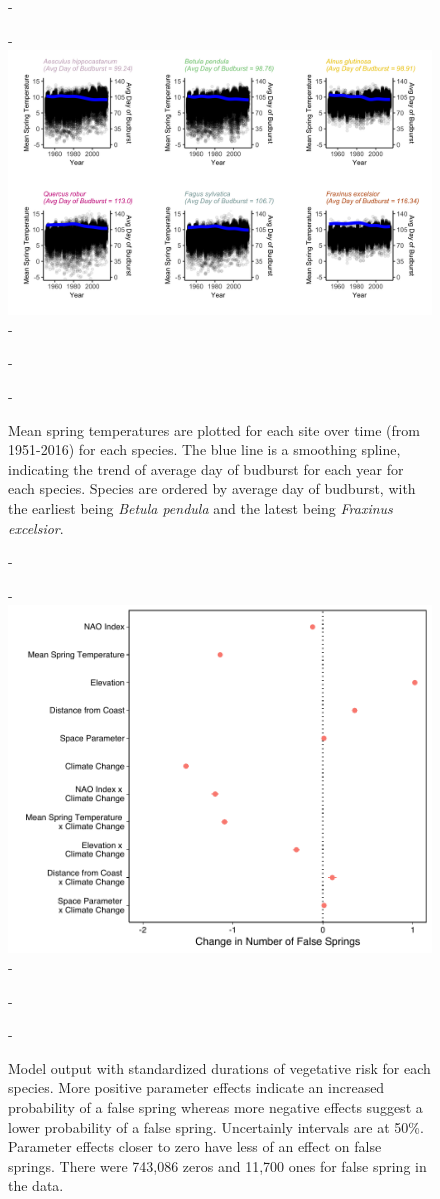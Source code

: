 \documentclass{article}\usepackage[]{graphicx}\usepackage[]{color}
\begin{document}
{\begin{figure} [H]
  -\begin{center}
  -\includegraphics[width=16cm]{..//figures/MSTBB_bySpp.png}
  -\caption{Mean spring temperatures are plotted for each site over time (from 1951-2016) for each species. The blue line is a smoothing spline, indicating the trend of average day of budburst for each year for each species. Species are ordered by average day of budburst, with the earliest being \textit{Betula pendula} and the latest being \textit{Fraxinus excelsior}. }\label{fig:mst}
  -\end{center}
  -\end{figure}}
  
  
{\begin{figure} [H]
  -\begin{center}
  -\includegraphics[width=12cm]{..//figures/model_output_bern_50.pdf}
  -\caption{Model output with standardized durations of vegetative risk for each species. More positive parameter effects indicate an increased probability of a false spring whereas more negative effects suggest a lower probability of a false spring. Uncertainly intervals are at 50\%. Parameter effects closer to zero have less of an effect on false springs. There were 743,086 zeros and 11,700 ones for false spring in the data.}\label{fig:maineffects}
  -\end{center}
  -\end{figure}}
  
\end{document}
